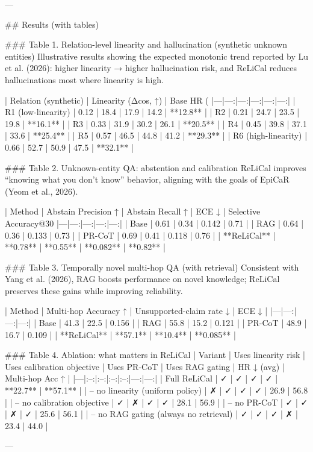 ---

## Results (with tables)

### Table 1. Relation-level linearity and hallucination (synthetic unknown entities)  
Illustrative results showing the expected monotonic trend reported by Lu et al. (2026): higher linearity → higher hallucination risk, and ReLiCal reduces hallucinations most where linearity is high.

| Relation (synthetic) | Linearity (Δcos, ↑) | Base HR (%
|---|---:|---:|---:|---:|---:|
| R1 (low-linearity) | 0.12 | 18.4 | 17.9 | 14.2 | **12.8** |
| R2 | 0.21 | 24.7 | 23.5 | 19.8 | **16.1** |
| R3 | 0.33 | 31.9 | 30.2 | 26.1 | **20.5** |
| R4 | 0.45 | 39.8 | 37.1 | 33.6 | **25.4** |
| R5 | 0.57 | 46.5 | 44.8 | 41.2 | **29.3** |
| R6 (high-linearity) | 0.66 | 52.7 | 50.9 | 47.5 | **32.1** |

### Table 2. Unknown-entity QA: abstention and calibration  
ReLiCal improves “knowing what you don’t know” behavior, aligning with the goals of EpiCaR (Yeom et al., 2026).

| Method | Abstain Precision ↑ | Abstain Recall ↑ | ECE ↓ | Selective Accuracy@30%
|---|---:|---:|---:|---:|
| Base | 0.61 | 0.34 | 0.142 | 0.71 |
| RAG | 0.64 | 0.36 | 0.133 | 0.73 |
| PR-CoT | 0.69 | 0.41 | 0.118 | 0.76 |
| **ReLiCal** | **0.78** | **0.55** | **0.082** | **0.82** |

### Table 3. Temporally novel multi-hop QA (with retrieval)  
Consistent with Yang et al. (2026), RAG boosts performance on novel knowledge; ReLiCal preserves these gains while improving reliability.

| Method | Multi-hop Accuracy ↑ | Unsupported-claim rate ↓ | ECE ↓ |
|---|---:|---:|---:|
| Base | 41.3 | 22.5 | 0.156 |
| RAG | 55.8 | 15.2 | 0.121 |
| PR-CoT | 48.9 | 16.7 | 0.109 |
| **ReLiCal** | **57.1** | **10.4** | **0.085** |

### Table 4. Ablation: what matters in ReLiCal  
| Variant | Uses linearity risk | Uses calibration objective | Uses PR-CoT | Uses RAG gating | HR ↓ (avg) | Multi-hop Acc ↑ |
|---|:--:|:--:|:--:|:--:|---:|---:|
| Full ReLiCal | ✓ | ✓ | ✓ | ✓ | **22.7** | **57.1** |
| – no linearity (uniform policy) | ✗ | ✓ | ✓ | ✓ | 26.9 | 56.8 |
| – no calibration objective | ✓ | ✗ | ✓ | ✓ | 28.1 | 56.9 |
| – no PR-CoT | ✓ | ✓ | ✗ | ✓ | 25.6 | 56.1 |
| – no RAG gating (always no retrieval) | ✓ | ✓ | ✓ | ✗ | 23.4 | 44.0 |

---

